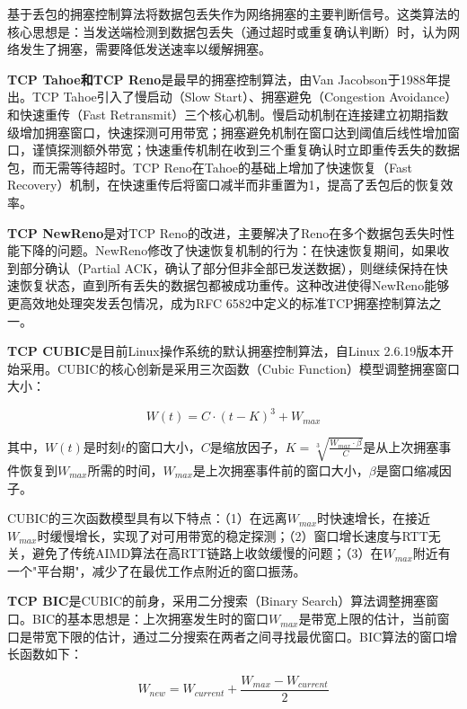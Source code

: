 基于丢包的拥塞控制算法将数据包丢失作为网络拥塞的主要判断信号。这类算法的核心思想是：当发送端检测到数据包丢失（通过超时或重复确认判断）时，认为网络发生了拥塞，需要降低发送速率以缓解拥塞。

\textbf{TCP Tahoe和TCP Reno}是最早的拥塞控制算法，由Van Jacobson于1988年提出。TCP Tahoe引入了慢启动（Slow Start）、拥塞避免（Congestion Avoidance）和快速重传（Fast Retransmit）三个核心机制。慢启动机制在连接建立初期指数级增加拥塞窗口，快速探测可用带宽；拥塞避免机制在窗口达到阈值后线性增加窗口，谨慎探测额外带宽；快速重传机制在收到三个重复确认时立即重传丢失的数据包，而无需等待超时。TCP Reno在Tahoe的基础上增加了快速恢复（Fast Recovery）机制，在快速重传后将窗口减半而非重置为1，提高了丢包后的恢复效率。

\textbf{TCP NewReno}是对TCP Reno的改进，主要解决了Reno在多个数据包丢失时性能下降的问题。NewReno修改了快速恢复机制的行为：在快速恢复期间，如果收到部分确认（Partial ACK，确认了部分但非全部已发送数据），则继续保持在快速恢复状态，直到所有丢失的数据包都被成功重传。这种改进使得NewReno能够更高效地处理突发丢包情况，成为RFC 6582中定义的标准TCP拥塞控制算法之一。

\textbf{TCP CUBIC}是目前Linux操作系统的默认拥塞控制算法，自Linux 2.6.19版本开始采用。CUBIC的核心创新是采用三次函数（Cubic Function）模型调整拥塞窗口大小：

\begin{equation}
W(t) = C \cdot (t - K)^3 + W_{max}
\end{equation}

其中，$W(t)$是时刻$t$的窗口大小，$C$是缩放因子，$K = \sqrt[3]{\frac{W_{max} \cdot \beta}{C}}$是从上次拥塞事件恢复到$W_{max}$所需的时间，$W_{max}$是上次拥塞事件前的窗口大小，$\beta$是窗口缩减因子。

CUBIC的三次函数模型具有以下特点：（1）在远离$W_{max}$时快速增长，在接近$W_{max}$时缓慢增长，实现了对可用带宽的稳定探测；（2）窗口增长速度与RTT无关，避免了传统AIMD算法在高RTT链路上收敛缓慢的问题；（3）在$W_{max}$附近有一个"平台期"，减少了在最优工作点附近的窗口振荡。

\textbf{TCP BIC}是CUBIC的前身，采用二分搜索（Binary Search）算法调整拥塞窗口。BIC的基本思想是：上次拥塞发生时的窗口$W_{max}$是带宽上限的估计，当前窗口是带宽下限的估计，通过二分搜索在两者之间寻找最优窗口。BIC算法的窗口增长函数如下：

\begin{equation}
W_{new} = W_{current} + \frac{W_{max} - W_{current}}{2}
\end{equation}

